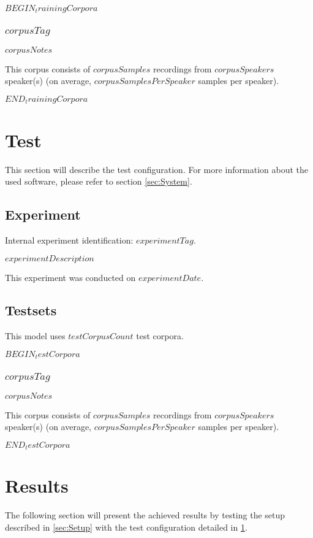 \documentclass[a4paper,10pt,bibtotoc]{scrartcl}
\begin{document}
\begin{multicols}{2}
$BEGIN_trainingCorpora$
\subsubsection{$corpusTag$}

$corpusNotes$

This corpus consists of $corpusSamples$ recordings from $corpusSpeakers$ speaker(s) (on average, $corpusSamplesPerSpeaker$ samples per speaker).

$END_trainingCorpora$

\section{Test}
\label{sec:Test}

This section will describe the test configuration. For more information about the used software, please refer to section \ref{sec:System}.

\subsection{Experiment}

Internal experiment identification: $experimentTag$.

$experimentDescription$

This experiment was conducted on $experimentDate$.

\subsection{Testsets}
\label{sec:Testsets}

This model uses $testCorpusCount$ test corpora.

$BEGIN_testCorpora$
\subsubsection{$corpusTag$}

$corpusNotes$

This corpus consists of $corpusSamples$ recordings from $corpusSpeakers$ speaker(s) (on average, $corpusSamplesPerSpeaker$ samples per speaker).

$END_testCorpora$


\section{Results}

The following section will present the achieved results by testing the setup described in \ref{sec:Setup} with the test configuration detailed in \ref{sec:Test}.


\end{multicols}
\end{document}
